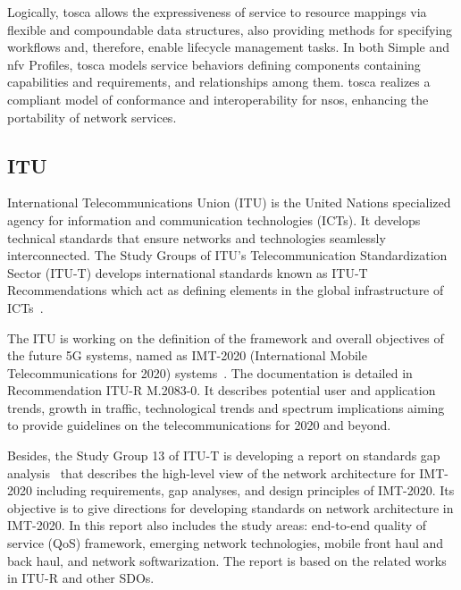 Logically, \gls{tosca} allows the expressiveness of service to resource mappings via flexible and compoundable data structures, also providing methods for specifying workflows and, therefore, enable lifecycle management tasks. In both Simple and \gls{nfv} Profiles, \gls{tosca} models service behaviors defining components containing capabilities and requirements, and relationships among them. \gls{tosca} realizes a compliant model of conformance and interoperability for \glspl{nso}, enhancing the portability of network services. 

\subsection {ITU}
International Telecommunications Union (ITU) is the United Nations specialized agency for information and communication technologies (ICTs). It develops technical standards that ensure networks and technologies seamlessly interconnected. The Study Groups of ITU’s Telecommunication Standardization Sector (ITU-T) develops international standards known as ITU-T Recommendations which act as defining elements in the global infrastructure of ICTs~\cite{ITUITU:World}.

The ITU is working on the definition of the framework and overall objectives of the future 5G systems, named as IMT-2020 (International Mobile Telecommunications for 2020) systems~\cite{ITU-R2015RecommendationBeyond}. The documentation is detailed in Recommendation ITU-R M.2083-0. It describes potential user and application trends, growth in traffic, technological trends and spectrum implications aiming to provide guidelines on the telecommunications for 2020 and beyond.

Besides, the Study Group 13 of ITU-T is developing a report on standards gap analysis~\cite{ITU-T2015FGAnalysis} that describes the high-level view of the network architecture for IMT-2020 including requirements, gap analyses, and design principles of IMT-2020. Its objective is to give directions for developing standards on network architecture in IMT-2020. In this report also includes the study areas:  end-to-end quality of service (QoS) framework, emerging network technologies, mobile front haul and back haul, and network softwarization. The report is based on the related works in ITU-R and other SDOs.